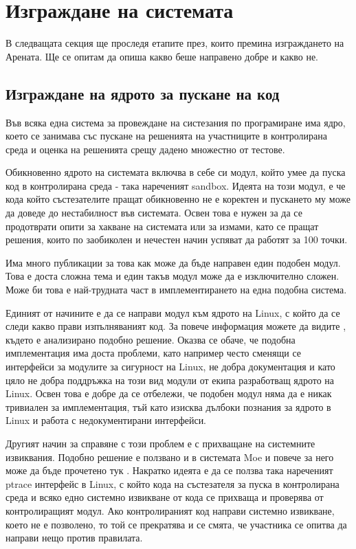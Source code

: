 \documentclass[a4paper,12pt]{article}
\begin{document}
  \section{Изграждане на системата}
  В следващата секция ще проследя етапите през, които премина изграждането на
  Арената. Ще се опитам да опиша какво беше направено добре и какво не.
  \subsection{Изграждане на ядрото за пускане на код}
  Във всяка една система за провеждане на систезания по програмиране има ядро,
  което се занимава със пускане на решенията на участниците в контролирана среда
  и оценка на решенията срещу дадено множестно от тестове.

  Обикновенно ядрото на системата включва в себе си модул, който умее да пуска код в контролирана среда - така нареченият sandbox. Идеята на този модул, е че кода който състезателите пращат обикновенно не е коректен и пускането му може да доведе до нестабилност във системата. Освен това е нужен за да се продотврати опити за хакване на системата или за измами, като се пращат решения, които по заобиколен и нечестен начин успяват да работят за 100 точки.
  
  Има много публикации за това как може да бъде направен един подобен модул. Това е доста сложна тема и един такъв модул може да е изключително сложен. Може би това е най-трудната част в имплементирането на една подобна система.
  
  Единият от начините е да се направи модул към ядрото на Linux, с който да се следи какво прави изпълняваният код. За повече информация можете да видите \cite{linux_sec_module_sandbox}, където е анализирано подобно решение. Оказва се обаче, че подобна имплементация има доста проблеми, като например често сменящи се интерфейси за модулите за сигурност на Linux, не добра документация и като цяло не добра поддръжка на този вид модули от екипа разработващ ядрото на Linux. Освен това е добре да се отбележи, че подобен модул няма да е никак тривиален за имплементация, тъй като изисква дълбоки познания за ядрото в Linux и работа с недокументирани интерфейси.
  
  Другият начин за справяне с този проблем е с прихващане на системните извиквания. Подобно решение е ползвано и в системата Moe и повече за него може да бъде прочетено тук \cite{perspectives_grading_systems}. Накратко идеята е да се ползва така нареченият ptrace интерфейс в Linux, с който кода на състезателя за пуска в контролирана среда и всяко едно системно извикване от кода се прихваща и проверява от контролиращият модул. Ако контролираният код направи системно извикване, което не е позволено, то той се прекратява и се смята, че участника се опитва да направи нещо против правилата.
  
\end{document}
